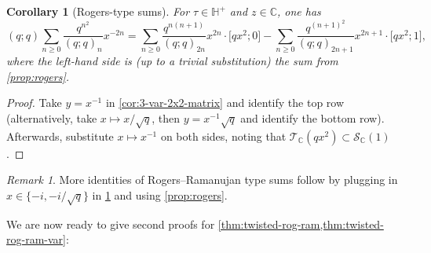 \documentclass[reqno,11pt]{amsart}
\newtheorem{corollary}[theorem]{Corollary}
\theoremstyle{definition}
\theoremstyle{remark}
\newtheorem*{remark}{Remark}
\numberwithin{equation}{section}
\newcommand{\C}{\mathbb{C}}
\renewcommand{\H}{{\mathbb{H}}}
\newcommand{\mT}{\mathcal{T}}
\newcommand{\mS}{\mathcal{S}}
\newcommand{\vect}[2]{\big[{#1};{#2}\big]}
\newcommand{\fix}[1]{\textcolor{blue}{\large (#1)\normalsize}}
\begin{document}
\begin{corollary}[Rogers-type sums] \label{cor:rogers-type-sums}
For $\tau \in \H^+$ and $z \in \C$, one has
\[
(q; q)
\sum_{n \ge 0} \frac{q^{n^2}}{(q; q)_n} x^{-2n}
= 
\sum_{n \ge 0} \frac{q^{n(n+1)}}{(q; q)_{2n}} x^{2n} \cdot \vect{qx^2}{0}
- \sum_{n \ge 0} \frac{q^{(n+1)^2}}{(q; q)_{2n+1}} x^{2n+1} \cdot \vect{qx^2}{1},
\]
where the left-hand side is (up to a trivial substitution) the sum from \cref{prop:rogers}.
\end{corollary}

\begin{proof}
Take $y = x^{-1}$ in \cref{cor:3-var-2x2-matrix} and identify the top row (alternatively, take $x \mapsto x/\sqrt{q}$, then $y = x^{-1}\sqrt{q}$ and identify the bottom row). Afterwards, substitute $x \mapsto x^{-1}$ on both sides, noting that $\mT_\C\left(qx^2\right) \subset \mS_\C(1)$.
\end{proof}

\begin{remark}
More identities of Rogers--Ramanujan type sums follow by plugging in $x \in \{-i, -i/\sqrt{q}\}$ in \cref{cor:rogers-type-sums} and using \cref{prop:rogers}.

\end{remark}



We are now ready to give second proofs for \cref{thm:twisted-rog-ram,thm:twisted-rog-ram-var}:
\end{document}
